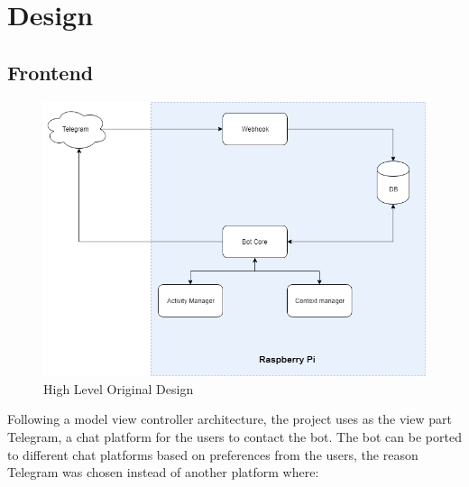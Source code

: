 \section{Design}\label{sec:chap4_ori_des_front}
\subsection{Frontend}\label{sec:chap4_ori_des_back}
\begin{center}
	\begin{figure}[h!]
		\centering
		\includegraphics[scale=0.5]{./images/4-original-struct}
		\caption{High Level Original Design}
		\label{4_original_struct}
	\end{figure}
\end{center}

Following a model view controller architecture, the project uses as the view part Telegram, a chat platform for the users to contact the bot. The bot can be ported to different chat platforms based on preferences from the users, the reason Telegram was chosen instead of another platform where:

